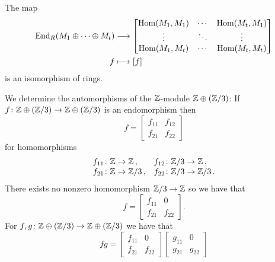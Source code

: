 \begin{corollary}
  The map
  \begin{align*}
              \operatorname{End}_R(M_1 \oplus \dotsb \oplus M_t)
    &\longrightarrow  \begin{bmatrix}
                \operatorname{Hom}(M_1, M_1)  & \cdots  & \operatorname{Hom}(M_t, M_1)  \\
                \vdots          & \ddots  & \vdots          \\
                \operatorname{Hom}(M_1, M_t)  & \cdots  & \operatorname{Hom}(M_t, M_t)
              \end{bmatrix}
    \\
                  f
    &\longmapsto  [f]
  \end{align*}
  is an isomorphism of rings.
\end{corollary}


\begin{example}
  We determine the automorphisms of the $\mathbb{Z}$-module $\mathbb{Z} \oplus (\mathbb{Z}/3)$:
  If $f \colon \mathbb{Z} \oplus (\mathbb{Z}/3) \to \mathbb{Z} \oplus (\mathbb{Z}/3)$ is an endomorphism then
  \[
      f
    = \begin{bmatrix}
        f_{11}  & f_{12}  \\
        f_{21}  & f_{22}
      \end{bmatrix}
  \]
  for homomorphisms
  \[
    \begin{array}{ll}
      f_{11}  \colon  \mathbb{Z}    \to \mathbb{Z} \,,
      &
      f_{12}  \colon  \mathbb{Z}/3  \to \mathbb{Z} \,,
      \\
      f_{21}  \colon  \mathbb{Z}    \to \mathbb{Z}/3 \,,
      &
      f_{22}  \colon  \mathbb{Z}/3  \to \mathbb{Z}/3 \,.
    \end{array}
  \]
  There exists no nonzero homomorphism $\mathbb{Z}/3 \to \mathbb{Z}$ so we have that
  \[
      f
    = \begin{bmatrix}
        f_{11}  & 0       \\
        f_{21}  & f_{22}
      \end{bmatrix}.
  \]
  For $f, g \colon \mathbb{Z} \oplus (\mathbb{Z}/3) \to \mathbb{Z} \oplus (\mathbb{Z}/3)$ we have that
  \[
      fg
    = \begin{bmatrix}
        f_{11}  & 0       \\
        f_{21}  & f_{22}
      \end{bmatrix}
      \begin{bmatrix}
        g_{11}  & 0       \\
        g_{21}  & g_{22}
      \end{bmatrix}
\]
\end{example}
